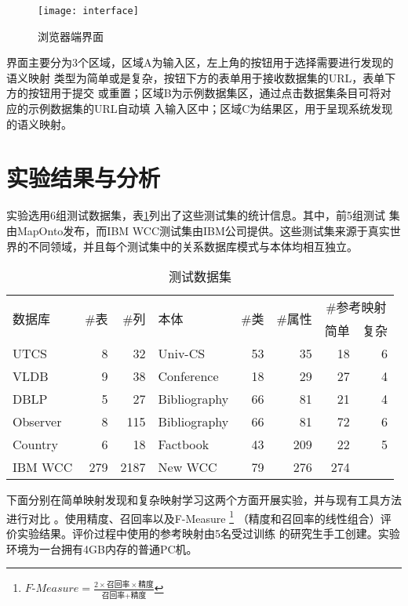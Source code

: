\begin{figure}[htbp]
\centerline{\texttt{[image: interface]}}
\caption{浏览器端界面}
\label{fig:interface}
\end{figure}

界面主要分为3个区域，区域A为输入区，左上角的按钮用于选择需要进行发现的语义映射
类型为简单或是复杂，按钮下方的表单用于接收数据集的URL，表单下方的按钮用于提交
或重置；区域B为示例数据集区，通过点击数据集条目可将对应的示例数据集的URL自动填
入输入区中；区域C为结果区，用于呈现系统发现的语义映射。

\section{实验结果与分析}

实验选用6组测试数据集，表\ref{tab1}列出了这些测试集的统计信息。其中，前5组测试
集由MapOnto\cite{10}发布，而IBM WCC测试集由IBM公司提供。这些测试集来源于真实世
界的不同领域，并且每个测试集中的关系数据库模式与本体均相互独立。

\begin{table}[htbp]
\centering
\caption{测试数据集}
\label{tab1}
\begin{tabular}{lrrlrrrr}
\hline
\multirow{2}{*}{数据库} & \multirow{2}{*}{\#表}&\multirow{2}{*}{\#列}&
\multirow{2}{*}{本体}&\multirow{2}{*}{\#类}&\multirow{2}{*}{\#属性} &
\multicolumn{2}{c}{\#参考映射}\\
\cline{7-8}
&&&&&&简单&复杂\\
\hline
UTCS		&8	&32	&Univ-CS	&53	&35	&18	&6\\
VLDB		&9	&38	&Conference	&18	&29	&27	&4\\
DBLP		&5	&27	&Bibliography	&66	&81	&21	&4\\
Observer	&8	&115	&Bibliography	&66	&81	&72	&6\\
Country		&6	&18	&Factbook	&43	&209	&22	&5\\
IBM WCC		&279	&2187	&New WCC	&79	&276	&274	&\\
\hline
\end{tabular}
\end{table}

下面分别在简单映射发现和复杂映射学习这两个方面开展实验，并与现有工具方法进行对比
。使用精度、召回率以及F-Measure
\footnote{$\textit{F-Measure} =
\frac{2 \times \textit{召回率} \times \textit{精度}}
{\textit{召回率} + \textit{精度}}$}
（精度和召回率的线性组合）评价实验结果。评价过程中使用的参考映射由5名受过训练
的研究生手工创建。实验环境为一台拥有4GB内存的普通PC机。

